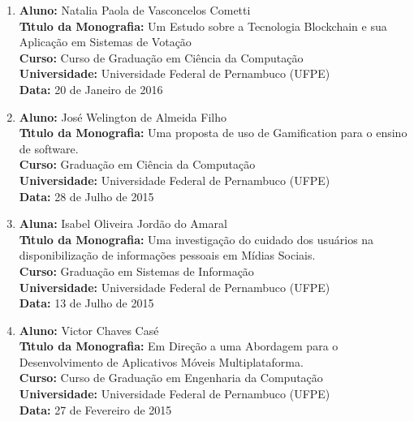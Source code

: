 \documentclass[a4paper,oneside,10pt]{article}
\begin{document}
\begin{enumerate}
\item       \textbf{Aluno:} Natalia Paola de Vasconcelos Cometti \mbox{} \\
            \textbf{T\'{\i}tulo da Monografia:} Um Estudo sobre a Tecnologia Blockchain e sua Aplicação em Sistemas de Votação\\
            \textbf{Curso:} Curso de Gradua\c{c}\~{a}o em Ciência da Computa\c{c}\~{a}o\\
            \textbf{Universidade:} Universidade Federal de Pernambuco (UFPE)\\
            \textbf{Data:} 20 de Janeiro de 2016

\item       \textbf{Aluno:} José Welington de Almeida Filho \mbox{}\\
            \textbf{T\'{\i}tulo da Monografia:} Uma proposta de uso de Gamification para o ensino de software.\\
            \textbf{Curso:} Graduação em Ciência da Computação\\
            \textbf{Universidade:} Universidade Federal de Pernambuco (UFPE)\\
            \textbf{Data:} 28 de Julho de 2015\\

\item       \textbf{Aluna:} Isabel Oliveira Jordão do Amaral \mbox{}\\
            \textbf{T\'{\i}tulo da Monografia:} Uma investigação do cuidado dos usuários na disponibilização de informações pessoais em Mídias Sociais.\\
            \textbf{Curso:} Graduação em Sistemas de Informação\\
            \textbf{Universidade:} Universidade Federal de Pernambuco (UFPE)\\
            \textbf{Data:} 13 de Julho de 2015\\

\item       \textbf{Aluno:} Victor Chaves Casé \mbox{}\\
            \textbf{T\'{\i}tulo da Monografia:} Em Direção a uma Abordagem para o Desenvolvimento de Aplicativos Móveis Multiplataforma.\\
            \textbf{Curso:} Curso de Gradua\c{c}\~{a}o em Engenharia da Computa\c{c}\~{a}o\\
            \textbf{Universidade:} Universidade Federal de Pernambuco (UFPE)\\
            \textbf{Data:} 27 de Fevereiro de 2015


\end{enumerate}
\end{document}
